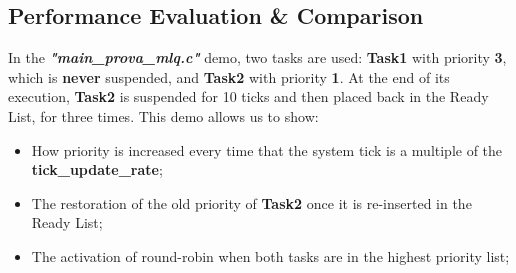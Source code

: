 \documentclass{article}
\begin{document}
\subsection{Performance Evaluation \& Comparison}
In the \textit{\textbf{"main\_prova\_mlq.c"}} demo, two tasks are used: \textbf{Task1} with priority \textbf{3}, which is \textbf{never} suspended, and \textbf{Task2} with priority \textbf{1}. At the end of its execution, \textbf{Task2} is suspended for 10 ticks and then placed back in the Ready List, for three times. This demo allows us to show:
\begin{itemize}
    \item How priority is increased every time that the system tick is a multiple of the \textbf{tick\_update\_rate};

    \item The restoration of the old priority of \textbf{Task2} once it is re-inserted in the Ready List;

    \item The activation of round-robin when both tasks are in the highest priority list;
\end{itemize}



\newpage
\end{document}
